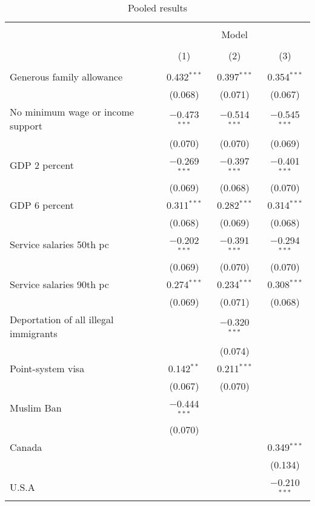 
\begin{table}[!htbp] \centering 
  \caption{Pooled results} 
  \label{tab:pooled} 
\begin{tabular}{@{\extracolsep{5pt}}lccc} 
\\[-1.8ex]\hline 
\hline \\[-1.8ex] 
 & \multicolumn{3}{c}{Model} \\ 
\cline{2-4} 
\\[-1.8ex] & (1) & (2) & (3)\\ 
\hline \\[-1.8ex] 
 Generous family allowance & 0.432$^{***}$ & 0.397$^{***}$ & 0.354$^{***}$ \\ 
  & (0.068) & (0.071) & (0.067) \\ 
  No minimum wage or income support & $-$0.473$^{***}$ & $-$0.514$^{***}$ & $-$0.545$^{***}$ \\ 
  & (0.070) & (0.070) & (0.069) \\ 
  GDP 2 percent & $-$0.269$^{***}$ & $-$0.397$^{***}$ & $-$0.401$^{***}$ \\ 
  & (0.069) & (0.068) & (0.070) \\ 
  GDP 6 percent & 0.311$^{***}$ & 0.282$^{***}$ & 0.314$^{***}$ \\ 
  & (0.068) & (0.069) & (0.068) \\ 
  Service salaries 50th pc & $-$0.202$^{***}$ & $-$0.391$^{***}$ & $-$0.294$^{***}$ \\ 
  & (0.069) & (0.070) & (0.070) \\ 
  Service salaries 90th pc & 0.274$^{***}$ & 0.234$^{***}$ & 0.308$^{***}$ \\ 
  & (0.069) & (0.071) & (0.068) \\ 
  Deportation of all illegal immigrants &  & $-$0.320$^{***}$ &  \\ 
  &  & (0.074) &  \\ 
  Point-system visa & 0.142$^{**}$ & 0.211$^{***}$ &  \\ 
  & (0.067) & (0.070) &  \\ 
  Muslim Ban & $-$0.444$^{***}$ &  &  \\ 
  & (0.070) &  &  \\ 
  Canada &  &  & 0.349$^{***}$ \\ 
  &  &  & (0.134) \\ 
  U.S.A &  &  & $-$0.210$^{***}$ \\ 

\end{tabular}
\end{table}
